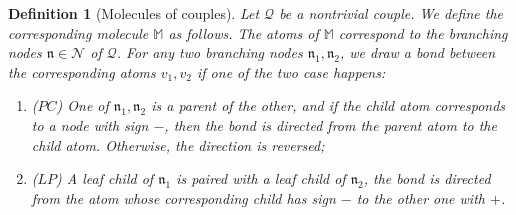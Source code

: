 \documentclass[UTF-8,reqno]{amsart}
\numberwithin{equation}{section}
\newtheorem{definition}[theorem]{Definition}
\theoremstyle{definition}
\begin{document}
\begin{definition}[Molecules of couples]\label{couple-molecule}
Let $\mathcal{Q}$ be a nontrivial couple. We define the corresponding molecule $\mathbb{M} $ as follows. The atoms of $\mathbb{M}$ correspond to the branching nodes $\mathfrak{n} \in \mathcal{N}$ of $\mathcal{Q}$. For any two branching nodes $\mathfrak{n}_1, \mathfrak{n}_2$, we draw a bond between the corresponding atoms $v_1, v_2$ if one of the two case happens:
\begin{enumerate}
\item ($PC$) One of $\mathfrak{n}_1, \mathfrak{n}_2$ is a parent of the other, and if the child atom corresponds to a node with sign $-$, then the bond is directed  from the parent atom to the child atom. Otherwise, the direction is reversed;
\item ($LP$) A leaf child of $\mathfrak{n}_1$ is paired with a leaf child of $\mathfrak{n}_2$, the bond is directed from the atom whose corresponding child   has sign $-$  to  the other one with $+$.
\end{enumerate}
 

\end{definition}

\end{document}
